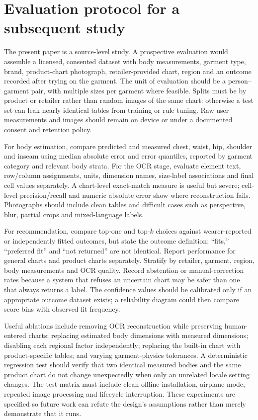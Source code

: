 \documentclass[11pt,a4paper]{article}
\begin{document}
\section{Evaluation protocol for a subsequent study}
The present paper is a source-level study. A prospective evaluation would assemble a licensed, consented dataset with body measurements, garment type, brand, product-chart photograph, retailer-provided chart, region and an outcome recorded after trying on the garment. The unit of evaluation should be a person--garment pair, with multiple sizes per garment where feasible. Splits must be by product or retailer rather than random images of the same chart: otherwise a test set can leak nearly identical tables from training or rule tuning. Raw user measurements and images should remain on device or under a documented consent and retention policy.

For body estimation, compare predicted and measured chest, waist, hip, shoulder and inseam using median absolute error and error quantiles, reported by garment category and relevant body strata. For the OCR stage, evaluate element text, row/column assignments, units, dimension names, size-label associations and final cell values separately. A chart-level exact-match measure is useful but severe; cell-level precision/recall and numeric absolute error show where reconstruction fails. Photographs should include clean tables and difficult cases such as perspective, blur, partial crops and mixed-language labels.

For recommendation, compare top-one and top-$k$ choices against wearer-reported or independently fitted outcomes, but state the outcome definition: ``fits,'' ``preferred fit'' and ``not returned'' are not identical. Report performance for general charts and product charts separately. Stratify by retailer, garment, region, body measurements and OCR quality. Record abstention or manual-correction rates because a system that refuses an uncertain chart may be safer than one that always returns a label. The confidence values should be calibrated only if an appropriate outcome dataset exists; a reliability diagram could then compare score bins with observed fit frequency.

Useful ablations include removing OCR reconstruction while preserving human-entered charts; replacing estimated body dimensions with measured dimensions; disabling each regional factor independently; replacing the built-in chart with product-specific tables; and varying garment-physics tolerances. A deterministic regression test should verify that two identical measured bodies and the same product chart do not change unexpectedly when only an unrelated locale setting changes. The test matrix must include clean offline installation, airplane mode, repeated image processing and lifecycle interruption. These experiments are specified so future work can refute the design's assumptions rather than merely demonstrate that it runs.
\end{document}
